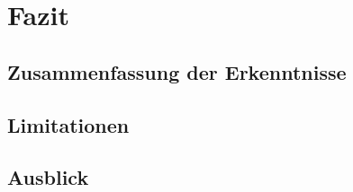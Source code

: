 \chapter{Fazit}

\section{Zusammenfassung der Erkenntnisse}

\section{Limitationen}

\section{Ausblick}

